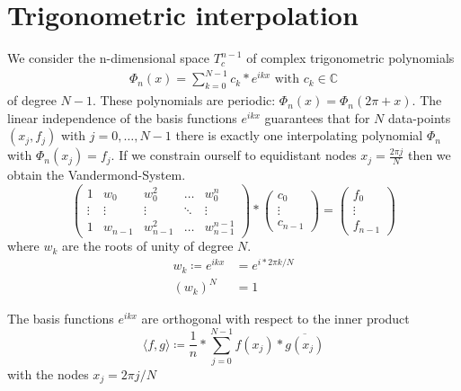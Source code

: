 \chapter{Trigonometric interpolation}\label{ch:trigonometric-interpolation}
We consider the n-dimensional space $T_c^{n-1}$ of complex trigonometric polynomials
\begin{align*}
    \Phi_n(x) = \sum_{k=0}^{N-1} c_k * e^{ikx} \text{ with } c_k \in \mathbb{C}
\end{align*}
of degree $N-1$.
These polynomials are periodic: $\Phi_n(x)=\Phi_n(2 \pi + x)$.
The linear independence of the basis functions $e^{ikx}$ guarantees that for $N$ data-points $(x_j, f_j)$ with $j= 0, \ldots, N-1$ there is exactly
one interpolating polynomial $\Phi_n$ with $\Phi_n(x_j)=f_j$.
If we constrain ourself to equidistant nodes $x_j = \frac{2  \pi j}{N}$ then we obtain the Vandermond-System.
\begin{equation*}
    \begin{pmatrix}
        1      & w_0     & w_0^2     & \dots  & w_0^n         \\
        \vdots & \vdots  & \vdots    & \ddots & \vdots        \\
        1      & w_{n-1} & w_{n-1}^2 & \dots  & w_{n-1}^{n-1}
    \end{pmatrix}
    *
    \begin{pmatrix*}
        c_0\\
        \vdots \\
        c_{n-1}
    \end{pmatrix*}
    =
    \begin{pmatrix*}
        f_0\\
        \vdots\\
        f_{n-1}
    \end{pmatrix*}
\end{equation*}
where $w_k$ are the roots of unity of degree $N$.
\begin{align*}
    w_k \coloneq e^{ikx} &= e^{i*2 \pi k / N}\\
    (w_k)^N &= 1
\end{align*}
\begin{lemma}
    The basis functions $e^{ikx}$ are orthogonal with respect to the inner product
    \begin{equation*}
        \langle f, g \rangle \coloneq \frac{1}{n} * \sum_{j=0}^{N-1} f(x_j) * \overline{g(x_j)}
    \end{equation*}
    with the nodes $x_j = {2\pi j}/{N}$
\end{lemma}
